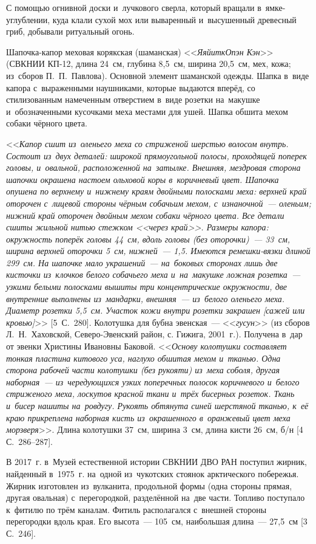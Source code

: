 С помощью огнивной доски и~лучкового сверла, который вращали в~ямке-углублении, куда клали сухой мох или вываренный и~высушенный древесный гриб, добывали ритуальный огонь.

Шапочка-капор меховая корякская (шаманская) <<\textit{ЯяйиткОпэн Кэн}>> (СВКНИИ КП-12, длина 24~см, глубина 8,5~см, ширина 20,5~см, мех, кожа; из~сборов П.~П.~Павлова). Основной элемент шаманской одежды. Шапка в~виде капора с~выраженными наушниками, которые выдаются вперёд, со стилизованным намеченным отверстием в~виде розетки на~макушке и~обозначенными кусочками меха местами для ушей. Шапка обшита мехом собаки чёрного цвета.

<<\textit{Капор сшит из~оленьего меха со стриженой шерстью волосом внутрь. Состоит из~двух деталей: широкой прямоугольной полосы, проходящей поперек головы, и~овальной, расположенной на~затылке. Внешняя, мездровая сторона шапочки окрашена настоем ольховой коры в~коричневый цвет. Шапочка опушена по верхнему и~нижнему краям двойными полосками меха: верхней край оторочен с~лицевой стороны чёрным собачьим мехом, с~изнаночной~--- оленьим; нижний край оторочен двойным мехом собаки чёрного цвета. Все детали сшиты жильной нитью стежком <<\textit{через край}>>. Размеры капора: окружность поперёк головы 44~см, вдоль головы (без оторочки)~--- 33~см, ширина верхней оторочки 5~см, нижней~--- 1,5. Имеются ремешки-вязки длиной 299~см. На шапочке мало украшений~--- на~боковых сторонах лишь две кисточки из~клочков белого собачьего меха и~на~макушке ложная розетка~--- узкими белыми полосками вышиты три концентрические окружности, две внутренние выполнены из~мандарки, внешняя~--- из~белого оленьего меха. Диаметр розетки 5,5~см. Участок кожи внутри розетки закрашен [сажей или кровью]}>> [5~С.~280].
\clearpage
Колотушка для бубна эвенская~--- <<\textit{гусун}>> (из сборов Л.~Н.~Хаховской, Северо-Эвенский район, с. Гижига, 2001~г.). Получена в~дар от эвенки Христины Ивановны Баковой. <<\textit{Основу колотушки составляет тонкая пластина китового уса, наглухо обшитая мехом и~тканью. Одна сторона рабочей части колотушки (без рукояти) из~меха соболя, другая наборная~--- из~чередующихся узких поперечных полосок коричневого и~белого стриженого меха, лоскутов красной ткани и~трёх бисерных розеток. Ткань и~бисер нашиты на~ровдугу. Рукоять обтянута синей шерстяной тканью, к~её краю прикреплена наборная кисть из~окрашенного в~оранжевый цвет меха морзверя}>>. Длина колотушки 37~см, ширина 3~см, длина кисти 26~см, б/н [4 С.~286--287].

В 2017~г. в~Музей естественной истории СВКНИИ ДВО РАН поступил жирник, найденный в~1975~г. на~одной из~чукотских стоянок арктического побережья. Жирник изготовлен из~вулканита, продольной формы (одна стороны прямая, другая овальная) с~перегородкой, разделённой на~две части. Топливо поступало к~фитилю по трём каналам. Фитиль располагался с~внешней стороны перегородки вдоль края. Его высота~--- 105~см, наибольшая длина~--- 27,5~см [3 С.~246].

